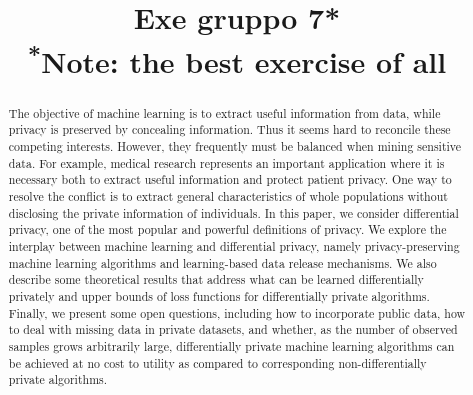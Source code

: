 \documentclass[conference]{IEEEtran}
\begin{document}
\title{Exe gruppo 7*\\
{\footnotesize \textsuperscript{*}Note: the best exercise of all}
}

\author{

\and
{}
\and
{}
\and
{}
}

\maketitle

\begin{abstract}
The objective of machine learning is to extract useful information from data, while privacy is preserved by concealing information. Thus it seems hard to reconcile these competing interests. However, they frequently must be balanced when mining sensitive data. For example, medical research represents an important application where it is necessary both to extract useful information and protect patient privacy. One way to resolve the conflict is to extract general characteristics of whole populations without disclosing the private information of individuals.
In this paper, we consider differential privacy, one of the most popular and powerful definitions of privacy. We explore the interplay between machine learning and differential privacy, namely privacy-preserving machine learning algorithms and learning-based data release mechanisms. We also describe some theoretical results that address what can be learned differentially privately and upper bounds of loss functions for differentially private algorithms.
Finally, we present some open questions, including how to incorporate public data, how to deal with missing data in private datasets, and whether, as the number of observed samples grows arbitrarily large, differentially private machine learning algorithms can be achieved at no cost to utility as compared to corresponding non-differentially private algorithms.
\end{abstract}
\end{document}
